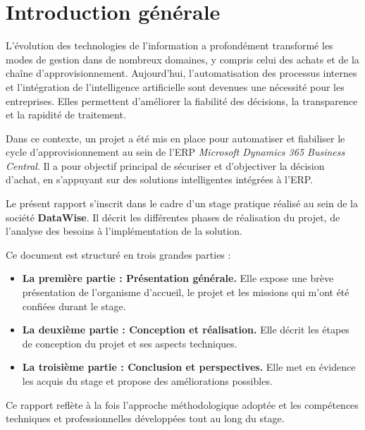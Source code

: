 \chapter*{Introduction générale}

L'évolution des technologies de l'information a profondément transformé les modes de gestion dans de nombreux domaines, y compris celui des achats et de la chaîne d'approvisionnement. Aujourd'hui, l'automatisation des processus internes et l'intégration de l'intelligence artificielle sont devenues une nécessité pour les entreprises. Elles permettent d'améliorer la fiabilité des décisions, la transparence et la rapidité de traitement.

Dans ce contexte, un projet a été mis en place pour automatiser et fiabiliser le cycle d'approvisionnement au sein de l'ERP \textit{Microsoft Dynamics 365 Business Central}. Il a pour objectif principal de sécuriser et d'objectiver la décision d'achat, en s'appuyant sur des solutions intelligentes intégrées à l'ERP.

Le présent rapport s'inscrit dans le cadre d'un stage pratique réalisé au sein de la société \textbf{DataWise}. Il décrit les différentes phases de réalisation du projet, de l'analyse des besoins à l'implémentation de la solution.

Ce document est structuré en trois grandes parties :

\begin{itemize}
    \item[---] \textbf{La première partie : Présentation générale.} Elle expose une brève présentation de l'organisme d'accueil, le projet et les missions qui m'ont été confiées durant le stage.
    \item[---] \textbf{La deuxième partie : Conception et réalisation.} Elle décrit les étapes de conception du projet et ses aspects techniques.
    \item[---] \textbf{La troisième partie : Conclusion et perspectives.} Elle met en évidence les acquis du stage et propose des améliorations possibles.
\end{itemize}

Ce rapport reflète à la fois l'approche méthodologique adoptée et les compétences techniques et professionnelles développées tout au long du stage.
